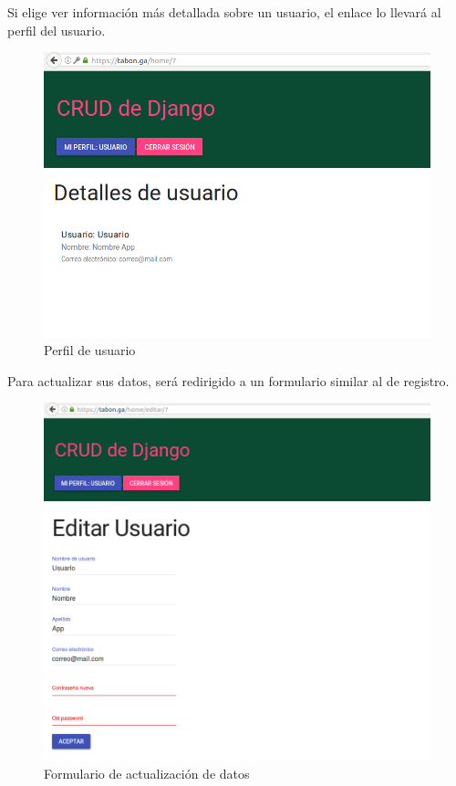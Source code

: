 \documentclass[12pt]{article}
\begin{document}
Si elige ver información más detallada sobre un usuario, el enlace lo llevará al perfil del usuario. \\
\begin{figure}[H]
  \centering
  \includegraphics[width=\textwidth]{crud/app4}
  \caption{Perfil de usuario}
\end{figure}

Para actualizar sus datos, será redirigido a un formulario similar al de registro.\\
\begin{figure}[H]
  \centering
  \includegraphics[width=\textwidth]{crud/app6}
  \caption{Formulario de actualización de datos}
\end{figure}
\end{document}
